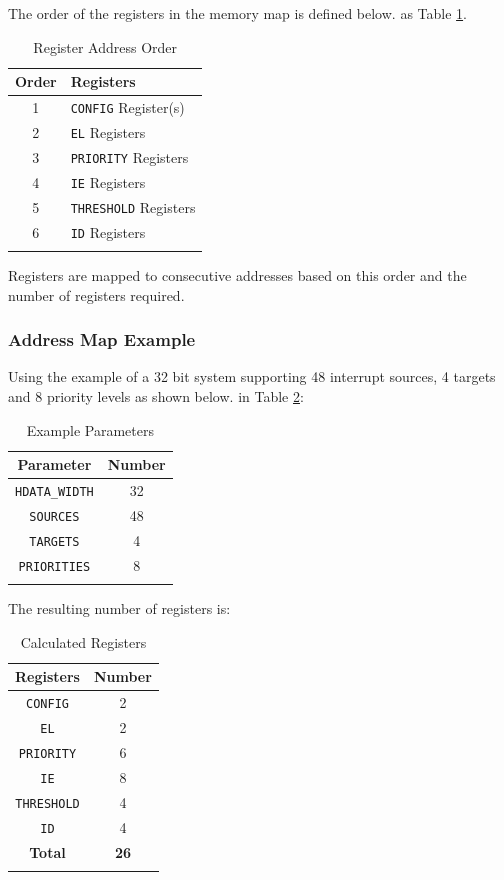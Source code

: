 The order of the registers in the memory map is defined 
\ifdefined\MARKDOWN
below.
\else
as Table \ref{tab:REGMAP}.
\fi

\begin{longtable}[]{@{}cl@{}}	
	\toprule 
	\textbf{Order} & \textbf{Registers}\\
	\midrule
	\endhead 
	1 & \texttt{CONFIG} Register(s)\\
	2 & \texttt{EL} Registers\\
	3 & \texttt{PRIORITY} Registers\\
	4 & \texttt{IE} Registers\\
	5 & \texttt{THRESHOLD} Registers\\
	6 & \texttt{ID} Registers\\
	\bottomrule 	
	\caption{Register Address Order}
	\label{tab:REGMAP}
\end{longtable}

Registers are mapped to consecutive addresses based on this order and the
number of registers required. 

\subsubsection{Address Map Example}

Using the example of a 32 bit system supporting 48 interrupt sources, 4 targets and 8 priority levels as shown 
\ifdefined\MARKDOWN
below.
\else
in Table \ref{tab:REGMAPEX}:
\fi

\begin{longtable}[c]{@{}cc@{}}	
		\toprule 
		\textbf{Parameter}    & \textbf{Number}\\
		\midrule 
		\endhead
		\texttt{HDATA\_WIDTH} & 32\\
		\texttt{SOURCES}      & 48\\
		\texttt{TARGETS}      & 4\\
		\texttt{PRIORITIES}   & 8\\
		\bottomrule 	
 
	\caption{Example Parameters}
	\label{tab:REGMAPEX}
\end{longtable}

The resulting number of registers is:

\begin{longtable}[c]{@{}cc@{}}	
		\toprule 
		\textbf{Registers} & \textbf{Number}\\
		\midrule 
		\endhead
		\texttt{CONFIG}    & 2\\
		\texttt{EL}        & 2\\
		\texttt{PRIORITY}  & 6\\
		\texttt{IE}        & 8\\
		\texttt{THRESHOLD} & 4\\
		\texttt{ID}        & 4\\
		\midrule
		\textbf{Total}     & \textbf{26}\\
		\bottomrule 	
	\caption{Calculated Registers}
	\label{tab:REGMAPNUM}
\end{longtable}

